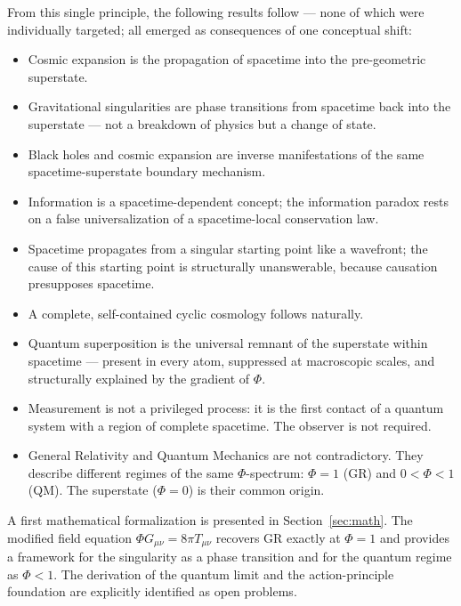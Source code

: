 \documentclass[12pt,a4paper]{article}
\begin{document}
From this single principle, the following results follow — none
of which were individually targeted; all emerged as consequences of
one conceptual shift:
\begin{itemize}
  \item Cosmic expansion is the propagation of spacetime into the
        pre-geometric superstate.
  \item Gravitational singularities are phase transitions from
        spacetime back into the superstate — not a breakdown of
        physics but a change of state.
  \item Black holes and cosmic expansion are inverse manifestations
        of the same spacetime-superstate boundary mechanism.
  \item Information is a spacetime-dependent concept; the information
        paradox rests on a false universalization of a spacetime-local
        conservation law.
  \item Spacetime propagates from a singular starting point like a
        wavefront; the cause of this starting point is structurally
        unanswerable, because causation presupposes spacetime.
  \item A complete, self-contained cyclic cosmology follows naturally.
  \item Quantum superposition is the universal remnant of the superstate
        within spacetime — present in every atom, suppressed at
        macroscopic scales, and structurally explained by the gradient
        of $\Phi$.
  \item Measurement is not a privileged process: it is the first
        contact of a quantum system with a region of complete spacetime.
        The observer is not required.
  \item General Relativity and Quantum Mechanics are not contradictory.
        They describe different regimes of the same $\Phi$-spectrum:
        $\Phi = 1$ (GR) and $0 < \Phi < 1$ (QM).  The superstate
        ($\Phi = 0$) is their common origin.
\end{itemize}

\noindent
A first mathematical formalization is presented in
Section~\ref{sec:math}.  The modified field equation
$\Phi G_{\mu\nu} = 8\pi T_{\mu\nu}$ recovers GR exactly at $\Phi = 1$
and provides a framework for the singularity as a phase transition
and for the quantum regime as $\Phi < 1$.  The derivation of the
quantum limit and the action-principle foundation are explicitly
identified as open problems.
\end{document}
